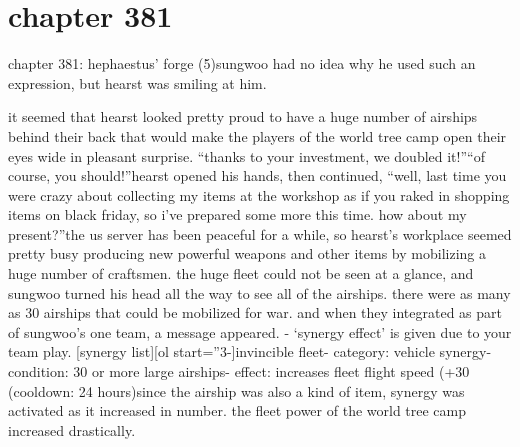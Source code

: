 \section{chapter 381}

chapter 381: hephaestus’ forge (5)sungwoo had no idea why he used such an expression, but hearst was smiling at him.





it seemed that hearst looked pretty proud to have a huge number of airships behind their back that would make the players of the world tree camp open their eyes wide in pleasant surprise.
“thanks to your investment, we doubled it!”“of course, you should!”hearst opened his hands, then continued, “well, last time you were crazy about collecting my items at the workshop as if you raked in shopping items on black friday, so i’ve prepared some more this time.
 how about my present?”the us server has been peaceful for a while, so hearst’s workplace seemed pretty busy producing new powerful weapons and other items by mobilizing a huge number of craftsmen.
the huge fleet could not be seen at a glance, and sungwoo turned his head all the way to see all of the airships.
 there were as many as 30 airships that could be mobilized for war.
and when they integrated as part of sungwoo’s one team, a message appeared.
- ‘synergy effect’ is given due to your team play.
[synergy list][ol start=”3-]invincible fleet- category: vehicle synergy- condition: 30 or more large airships- effect: increases fleet flight speed (+30%
 (cooldown: 24 hours)since the airship was also a kind of item, synergy was activated as it increased in number.
 the fleet power of the world tree camp increased drastically.

